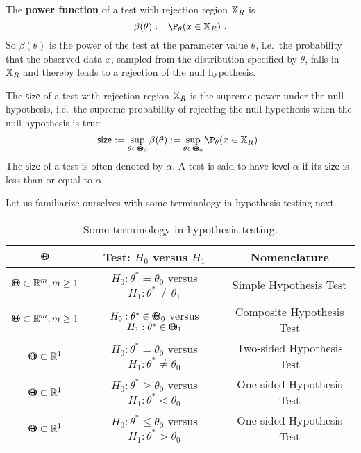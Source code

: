 \begin{definition}
The {\bf power function} of a test with rejection region $\mathbb{X}_R$ is
\begin{equation}\label{E:power}
\beta(\theta) := \P_{\theta}(x \in \Xz_R) \ .
\end{equation}
So $\beta(\theta)$ is the power of the test at the parameter value $\theta$, i.e.~the probability that the observed data $x$, sampled from the distribution specified by $\theta$, falls in $\mathbb{X}_R$ and thereby leads to a rejection of the null hypothesis.

The $\mathsf{size}$ of a test with rejection region $\mathbb{X}_R$ is the supreme power under the null hypothesis, i.e.~the supreme probability of rejecting the null hypothesis when the null hypothesis is true:
\begin{equation}\label{E:size}
\mathsf{size} := \sup_{\theta \in \BB{\Theta}_0} \beta(\theta) := \sup_{\theta \in \BB{\Theta}_0} \P_{\theta}(x \in \Xz_R) \ .
\end{equation}
The $\mathsf{size}$ of a test is often denoted by $\alpha$.  A test is said to have $\mathsf{level}$ $\alpha$ if its $\mathsf{size}$ is less than or equal to $\alpha$.
\end{definition}
Let us familiarize ourselves with some terminology in hypothesis testing next.
\begin{table}[htbp]
\begin{center}
\caption{Some terminology in hypothesis testing.}
\begin{tabular}{c|c|c}\hline
${\Theta}\mspace{-11 mu}{\Theta}$ & Test: $H_0$ versus $H_1$ & Nomenclature \\ \hline
${\Theta}\mspace{-11 mu}{\Theta} \subset \mathbb{R}^m, m \geq 1$ & $H_0: \theta^* = \theta_0$ versus $H_1: \theta^* \neq \theta_1$ & Simple Hypothesis Test \\ \hline
${\Theta}\mspace{-11 mu}{\Theta} \subset \mathbb{R}^m, m \geq 1$ & $H_0: \theta^* \in {\Theta}\mspace{-11 mu}{\Theta}_0$ versus $H_1: \theta^* \in {\Theta}\mspace{-11 mu}{\Theta}_1 $ & Composite Hypothesis Test \\ \hline
${\Theta}\mspace{-11 mu}{\Theta} \subset \mathbb{R}^1$ & $H_0: \theta^* = \theta_0$ versus $H_1: \theta^* \neq \theta_0$ & Two-sided Hypothesis Test \\ \hline
${\Theta}\mspace{-11 mu}{\Theta} \subset \mathbb{R}^1$ & $H_0: \theta^* \geq \theta_0$ versus $H_1: \theta^* < \theta_0$ & One-sided Hypothesis Test \\ \hline
${\Theta}\mspace{-11 mu}{\Theta} \subset \mathbb{R}^1$ & $H_0: \theta^* \leq \theta_0$ versus $H_1: \theta^* > \theta_0$ & One-sided Hypothesis Test \\ \hline
\end{tabular}
\end{center}
\end{table}

